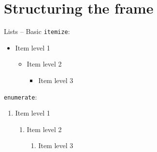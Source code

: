 \documentclass[table,aspectratio=43]{beamer}
\begin{document}
  \section{Structuring the frame}

  \begin{frame}{Lists -- Basic}
    \texttt{itemize}:
    \begin{itemize}
      \item Item level 1
            \begin{itemize}
              \item Item level 2
                    \begin{itemize}
                      \item Item level 3
                    \end{itemize}
            \end{itemize}
    \end{itemize}

    \texttt{enumerate}:
    \begin{enumerate}
      \item Item level 1
            \begin{enumerate}
              \item Item level 2
                    \begin{enumerate}
                      \item Item level 3
                    \end{enumerate}
            \end{enumerate}
    \end{enumerate}
  \end{frame}
\end{document}
